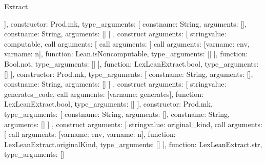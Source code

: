 \begin{lexlean}{Extract}
\begin{toolingmodule}
{{{{{{{                      ],
                      constructor: Prod.mk,
                      type_arguments: [
                        const{name: String, arguments: []},
                        const{name: String, arguments: []}
                      ]
                    },
                    construct{
                      arguments: [
                        string{value: computable},
                        call{
                          arguments: [
                            call{
                              arguments: [
                                call{
                                  arguments: [var{name: env}, var{name: n}],
                                  function: Lean.isNoncomputable,
                                  type_arguments: []
                                }
                              ],
                              function: Bool.not,
                              type_arguments: []
                            }
                          ],
                          function: LexLeanExtract.bool,
                          type_arguments: []
                        }
                      ],
                      constructor: Prod.mk,
                      type_arguments: [
                        const{name: String, arguments: []},
                        const{name: String, arguments: []}
                      ]
                    },
                    construct{
                      arguments: [
                        string{value: generates_code},
                        call{
                          arguments: [var{name: generates}],
                          function: LexLeanExtract.bool,
                          type_arguments: []
                        }
                      ],
                      constructor: Prod.mk,
                      type_arguments: [
                        const{name: String, arguments: []},
                        const{name: String, arguments: []}
                      ]
                    },
                    construct{
                      arguments: [
                        string{value: original_kind},
                        call{
                          arguments: [
                            call{
                              arguments: [var{name: env}, var{name: n}],
                              function: LexLeanExtract.originalKind,
                              type_arguments: []
                            }
                          ],
                          function: LexLeanExtract.str,
                          type_arguments: []
                        }
}}}}}}}
\end{toolingmodule}
\end{lexlean}
